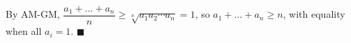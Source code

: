By AM-GM, $\dfrac{a_1+\dots+a_n}n\ge\sqrt[n]{a_1a_2\cdots a_n}=1$, so $a_1+\dots+a_n\ge n$, with equality when all $a_i=1$. $\blacksquare$

